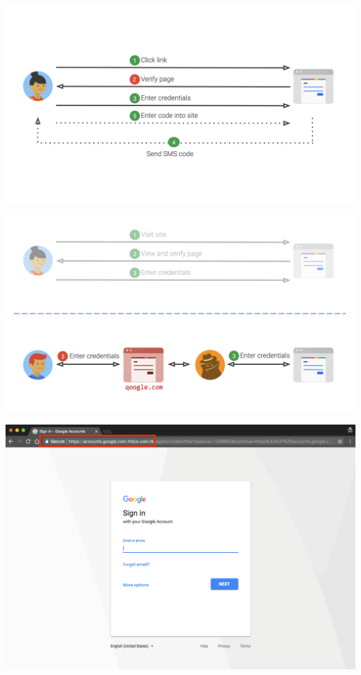 \documentclass[nobackground,dvipsnames,table]{beamer}
\begin{document}
\begin{frame}{}%
    \thispagestyle{empty}
    \includegraphics[width=\paperwidth]{login-diagram}
\end{frame}

\begin{frame}{}%
    \thispagestyle{empty}
    \includegraphics[width=\paperwidth]{login-diagram-phishing}
\end{frame}

\begin{frame}{}%
    \thispagestyle{empty}
    \includegraphics[width=\paperwidth]{bad-link-browser}
\end{frame}
\end{document}
